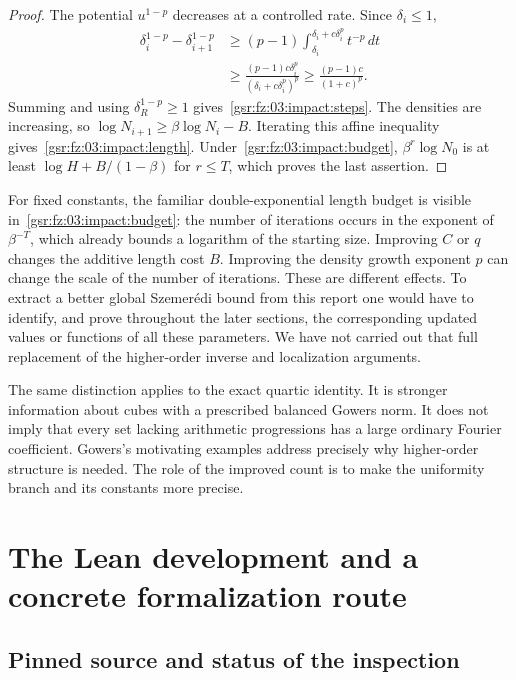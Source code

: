 \documentclass[11pt,letterpaper]{article}
\numberwithin{equation}{section}
\theoremstyle{definition}
\theoremstyle{remark}
\newcommand{\1}{\mathbf 1}
\newcommand{\srctag}[1]{\texorpdfstring{\enspace\textup{[#1]}}{ [#1]}}
\newcommand{\srcnote}[2]{\par\noindent{\small\textit{Source #1, delivered #2.}}\par}
\begin{document}
\begin{proof}
The potential $u^{1-p}$ decreases at a controlled rate. Since
$\delta_i\le1$,
\begin{align*}
 \delta_i^{1-p}-\delta_{i+1}^{1-p}
 &\ge (p-1)\int_{\delta_i}^{\delta_i+c\delta_i^p}t^{-p}\,dt\\
 &\ge\frac{(p-1)c\delta_i^p}{(\delta_i+c\delta_i^p)^p}
 \ge\frac{(p-1)c}{(1+c)^p}.
\end{align*}
Summing and using $\delta_R^{1-p}\ge1$ gives~\eqref{gsr:fz:03:impact:steps}.
The densities are increasing, so
$\log N_{i+1}\ge\beta\log N_i-B$.
Iterating this affine inequality gives~\eqref{gsr:fz:03:impact:length}.
Under~\eqref{gsr:fz:03:impact:budget}, $\beta^r\log N_0$ is at least
$\log H+B/(1-\beta)$ for $r\le T$, which proves the last assertion.
\end{proof}

For fixed constants, the familiar double-exponential length budget is
visible in~\eqref{gsr:fz:03:impact:budget}: the number of iterations occurs in the
exponent of $\beta^{-T}$, which already bounds a logarithm of the
starting size. Improving $C$ or $q$ changes the additive length cost $B$.
Improving the density growth exponent $p$ can change the scale of the
number of iterations. These are different effects. To extract a better
global Szemer\'edi bound from this report one would have to identify,
and prove throughout the later sections, the corresponding updated
values or functions of all these parameters. We have not carried out
that full replacement of the higher-order inverse and localization
arguments.

The same distinction applies to the exact quartic identity. It is
stronger information about cubes with a prescribed balanced Gowers norm.
It does not imply that every set lacking arithmetic progressions has a
large ordinary Fourier coefficient. Gowers's motivating examples address
precisely why higher-order structure is needed. The role of the improved
count is to make the uniformity branch and its constants more precise.

\section[{The Lean development and a concrete formalization route\srctag{03}}]{The Lean development and a concrete formalization route}\label{gsr:fz:03:sec:d10}
\srcnote{03}{Section 10}
\label{gsr:fz:03:sec:formal}

\subsection{Pinned source and status of the inspection}
\end{document}

